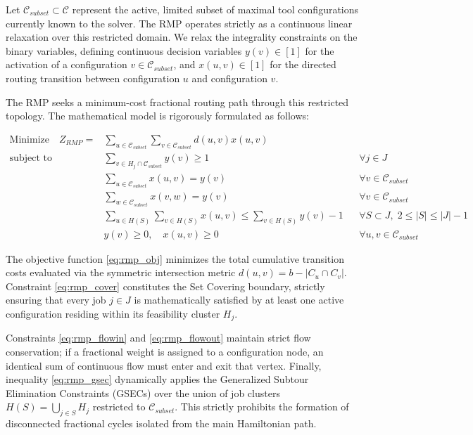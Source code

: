 \documentclass[11pt, a4paper]{book}
\begin{document}
	Let $\mathcal{C}_{subset} \subset \mathcal{C}$ represent the active, limited subset of maximal tool configurations currently known to the solver. The RMP operates strictly as a continuous linear relaxation over this restricted domain. We relax the integrality constraints on the binary variables, defining continuous decision variables $y(v) \in [1]$ for the activation of a configuration $v \in \mathcal{C}_{subset}$, and $x(u,v) \in [1]$ for the directed routing transition between configuration $u$ and configuration $v$.
	
	The RMP seeks a minimum-cost fractional routing path through this restricted topology. The mathematical model is rigorously formulated as follows:
	
	\begin{align}
		\text{Minimize} \quad Z_{RMP} = & \sum_{u \in \mathcal{C}_{subset}} \sum_{v \in \mathcal{C}_{subset}} d(u, v) x(u, v) \label{eq:rmp_obj} \\
		\text{subject to} \quad & \sum_{v \in H_j \cap \mathcal{C}_{subset}} y(v) \ge 1 && \forall j \in J \label{eq:rmp_cover} \\
		& \sum_{u \in \mathcal{C}_{subset}} x(u, v) = y(v) && \forall v \in \mathcal{C}_{subset} \label{eq:rmp_flowin} \\
		& \sum_{w \in \mathcal{C}_{subset}} x(v, w) = y(v) && \forall v \in \mathcal{C}_{subset} \label{eq:rmp_flowout} \\
		& \sum_{u \in H(S)} \sum_{v \in H(S)} x(u, v) \le \sum_{v \in H(S)} y(v) - 1 && \forall S \subset J, \; 2 \le |S| \le |J|-1 \label{eq:rmp_gsec} \\
		& y(v) \ge 0, \quad x(u, v) \ge 0 && \forall u, v \in \mathcal{C}_{subset}
	\end{align}
	
	The objective function \eqref{eq:rmp_obj} minimizes the total cumulative transition costs evaluated via the symmetric intersection metric $d(u,v) = b - |C_u \cap C_v|$. Constraint \eqref{eq:rmp_cover} constitutes the Set Covering boundary, strictly ensuring that every job $j \in J$ is mathematically satisfied by at least one active configuration residing within its feasibility cluster $H_j$. 
	
	Constraints \eqref{eq:rmp_flowin} and \eqref{eq:rmp_flowout} maintain strict flow conservation; if a fractional weight is assigned to a configuration node, an identical sum of continuous flow must enter and exit that vertex. Finally, inequality \eqref{eq:rmp_gsec} dynamically applies the Generalized Subtour Elimination Constraints (GSECs) over the union of job clusters $H(S) = \bigcup_{j \in S} H_j$ restricted to $\mathcal{C}_{subset}$. This strictly prohibits the formation of disconnected fractional cycles isolated from the main Hamiltonian path.
	
\end{document}
